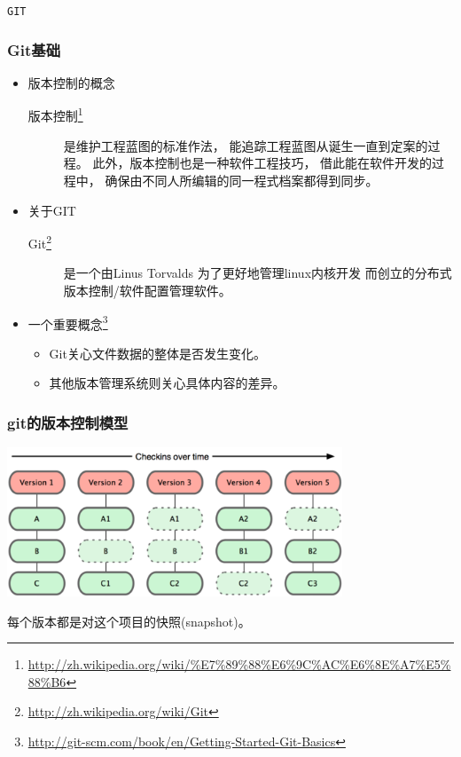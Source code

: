 
\begin{frame}
    \begin{center}
        \LARGE \tt{GIT}
    \end{center}
\end{frame}

\begin{frame}
    \frametitle{Git基础}
    \begin{itemize}    
        \item 版本控制的概念
            \begin{description}
                \item[版本控制\footnote{\url{http://zh.wikipedia.org/wiki/\%E7\%89\%88\%E6\%9C\%AC\%E6\%8E\%A7\%E5\%88\%B6}}] 
                    是维护工程蓝图的标准作法，
                    能追踪工程蓝图从诞生一直到定案的过程。
                    此外，版本控制也是一种软件工程技巧，
                    借此能在软件开发的过程中，
                    确保由不同人所编辑的同一程式档案都得到同步。
            \end{description}
        \item 关于GIT
            \begin{description}
                \item[Git\footnote{\url{http://zh.wikipedia.org/wiki/Git}}] 
                    是一个由Linus Torvalds
                    为了更好地管理linux内核开发
                    而创立的分布式版本控制/软件配置管理软件。
            \end{description}
        \item 一个重要概念\footnote{\url{http://git-scm.com/book/en/Getting-Started-Git-Basics}}
            \begin{itemize}
                \item Git关心文件数据的整体是否发生变化。
                \item 其他版本管理系统则关心具体内容的差异。
            \end{itemize}
    \end{itemize}
\end{frame}

\begin{frame}
    \frametitle{git的版本控制模型}
    \includegraphics[width=10cm,keepaspectratio]{data/GitRevisionModel.png}

    每个版本都是对这个项目的快照(snapshot)。
\end{frame}

